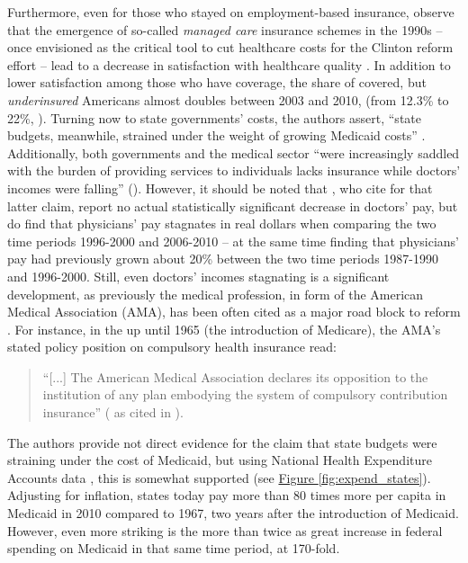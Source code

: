 \documentclass[11pt]{article}
\begin{document}
Furthermore, even for those who stayed on employment-based insurance, \textcite[][]{Jacobs2014} observe that the emergence of so-called \textit{managed care} insurance schemes in the 1990s -- once envisioned as the critical tool to cut healthcare costs for the Clinton reform effort -- lead to a decrease in satisfaction with healthcare quality \parencite[see][]{Thorpe1999}. In addition to lower satisfaction among those who have coverage, the share of covered, but \textit{underinsured} Americans almost doubles between 2003 and 2010, (from 12.3\% to 22\%, ). Turning now to state governments' costs, the authors assert, \enquote{state budgets, meanwhile, strained under the weight of growing Medicaid costs} \parencite[][p. 451]{Jacobs2014}. Additionally, both governments and the medical sector \enquote{were increasingly saddled with the burden of providing services to individuals lacks insurance while doctors' incomes were falling} (). However, it should be noted that \textcite[][]{Seabury2012}, who \textcite[][]{Jacobs2014} cite for that latter claim, report no actual statistically significant decrease in doctors' pay, but do find that physicians' pay stagnates in real dollars when comparing the two time periods 1996-2000 and 2006-2010 -- at the same time finding that physicians' pay had previously grown about 20\% between the two time periods 1987-1990 and 1996-2000. Still, even doctors' incomes stagnating is a significant development, as previously the medical profession, in form of the American Medical Association (AMA), has been often cited as a major road block to reform \parencite[][]{Hacker1998}. For instance, in the up until 1965 (the introduction of Medicare), the AMA's stated policy position on compulsory health insurance read:

\begin{quote}
  \enquote{[...] The American Medical Association declares its opposition to the institution of any plan embodying the system of compulsory contribution insurance} ( as cited in ).
\end{quote}

The authors provide not direct evidence for the claim that state budgets were straining under the cost of Medicaid, but using National Health Expenditure Accounts data \parencite[][]{NHEA}, this is somewhat supported (see \hyperref[fig:expend_states]{Figure \ref*{fig:expend_states}}). Adjusting for inflation, states today pay more than 80 times more per capita in Medicaid in 2010 compared to 1967, two years after the introduction of Medicaid. However, even more striking is the more than twice as great increase in federal spending on Medicaid in that same time period, at 170-fold.
\end{document}
